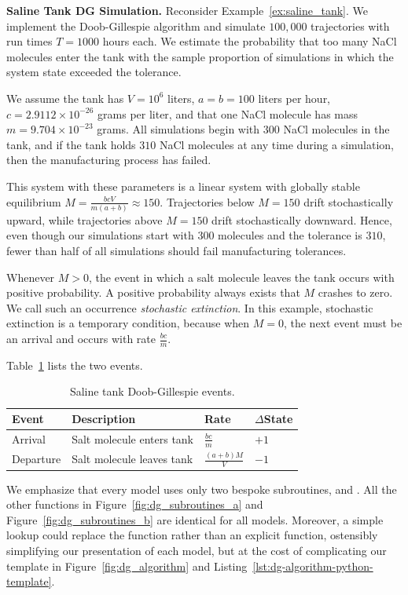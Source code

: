 \begin{example}\label{ex:saline_tank_code}
\textbf{Saline Tank DG Simulation.}
Reconsider Example~\ref{ex:saline_tank}. We implement the Doob-Gillespie algorithm and simulate $100,000$ trajectories with run times $T = 1000$ hours each. We estimate the probability that too many NaCl molecules enter the tank with the sample proportion of simulations in which the system state exceeded the tolerance.

We assume the tank has $V = 10^6$ liters, $a = b = 100$ liters per hour, $c = 2.9112 \times 10^{-26}$ grams per liter, and that one NaCl molecule has mass $m = 9.704 \times 10^{-23}$ grams. All simulations begin with $300$ NaCl molecules in the tank, and if the tank holds $310$ NaCl molecules at any time during a simulation, then the manufacturing process has failed.

This system with these parameters is a linear system with globally stable equilibrium $M = \frac{bcV}{m(a+b)} \approx 150$. Trajectories below $M = 150$ drift stochastically upward, while trajectories above $M = 150$ drift stochastically downward. Hence, even though our simulations start with $300$ molecules and the tolerance is $310$, fewer than half of all simulations should fail manufacturing tolerances.

Whenever $M > 0$, the event in which a salt molecule leaves the tank occurs with positive probability. A positive probability always exists that $M$ crashes to zero. We call such an occurrence \textit{stochastic extinction}. In this example, stochastic extinction is a temporary condition, because when $M = 0$, the next event must be an arrival and occurs with rate $\frac{bc}{m}$.

Table~\ref{tab:saline_tank_events} lists the two events.

\begin{table}[htbp]
\centering
\caption{Saline tank Doob-Gillespie events.}\label{tab:saline_tank_events}
\begin{tabular}{llll}
\hline
Event & Description & Rate & $\Delta$State \\
\hline
Arrival & Salt molecule enters tank & $\frac{bc}{m}$ & $+1$ \\
Departure & Salt molecule leaves tank & $\frac{(a+b)M}{V}$ & $-1$ \\
\hline
\end{tabular}
\end{table}

We emphasize that every model uses only two bespoke subroutines, \MakeRates and \MakeDeltaStates.
All the other functions in Figure~\ref{fig:dg_subroutines_a} and Figure~\ref{fig:dg_subroutines_b} are identical for all models.
Moreover, a simple lookup could replace the function \MakeDeltaStates rather than an explicit function, ostensibly simplifying our presentation of each model, but at the cost of complicating our template in Figure~\ref{fig:dg_algorithm} and Listing~\ref{lst:dg-algorithm-python-template}.


\end{example}

